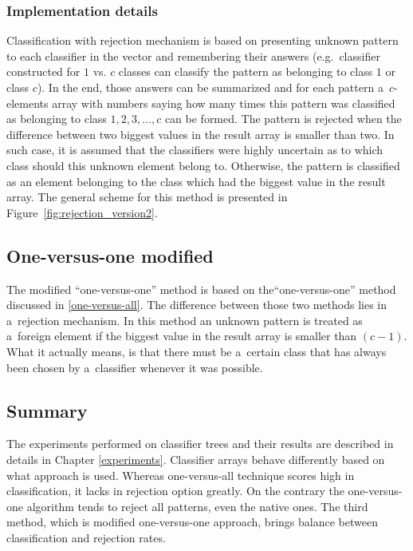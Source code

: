 \subsubsection{Implementation details}

Classification with rejection mechanism is based on presenting unknown pattern to each classifier in the vector and remembering their answers (e.g.~classifier constructed for $1$ vs. $c$ classes can classify the pattern as belonging to class $1$ or class $c$). In the end, those answers can be summarized and for each pattern a~$c$-elements array with numbers saying how many times this pattern was classified as belonging to class $1, 2, 3, \ldots, c$ can be formed. The pattern is rejected when the difference between two biggest values in the result array is smaller than two. In such case, it is assumed that the classifiers were highly uncertain as to which class should this unknown element belong to. Otherwise, the pattern is classified as an element belonging to the class which had the biggest value in the result array. The general scheme for this method is presented in Figure~\ref{fig:rejection_version2}. 

\subsection{One-versus-one modified}

The modified ``one-versus-one'' method is based on the``one-versus-one'' method discussed in \ref{one-versus-all}. The difference between those two methods lies in a~rejection mechanism. In this method an unknown pattern is treated as a~foreign element if the biggest value in the result array is smaller than $(c-1)$. What it actually means, is that there must be a~certain class that has always been chosen by a~classifier whenever it was possible.

\subsection{Summary}

The experiments performed on classifier trees and their results are described in details in Chapter \ref{experiments}. Classifier arrays behave differently based on what approach is used. Whereas one-versus-all technique scores high in classification, it lacks in rejection option greatly. On the contrary the one-versus-one algorithm tends to reject all patterns, even the native ones. The third method, which is modified one-versus-one approach, brings balance between classification and rejection rates. 